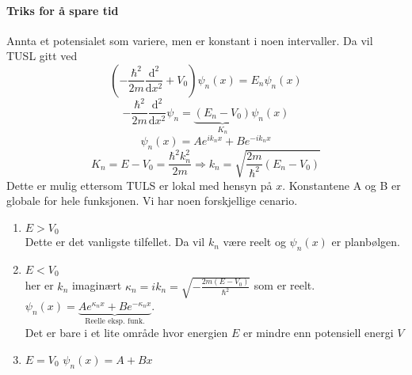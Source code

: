 \paragraph{Triks for å spare tid}
Annta et potensialet som variere, men er konstant i noen intervaller. Da vil TUSL gitt ved 
\[
\left(- \frac{ℏ^2}{2m}\frac{\mathrm{d}^2}{\mathrm{d}x^2} + V_0\right)ψ_n(x) = E_nψ_n(x)
\]
\[
- \frac{ℏ^2}{2m}\frac{\mathrm{d}^2}{\mathrm{d}x^2} ψ_n = \underbrace{\left(E_n - V_0\right)}_{K_n} ψ_n(x)
\]
\[
ψ_n(x) = A e^{i k_nx} + B e^{-i k_nx}
\]
\[
K_n = E - V_0 = \frac{ℏ^2 k_n^2}{2m} ⇒ k_n = \sqrt{\frac{2m}{ℏ^2}(E_n - V_0)}
\]
Dette er mulig ettersom TULS er lokal med hensyn på $x$. Konstantene A og B er globale for hele funksjonen. 
Vi har noen forskjellige cenario. 
\begin{enumerate}
    \item $E > V_0$\\
    Dette er det vanligste tilfellet. Da vil $k_n$ være reelt og $ψ_n(x)$ er planbølgen. 
    \item $E < V_0$\\
    her er $k_n$ imaginært $κ_n = i k_n = \displaystyle \sqrt{- \frac{2m(E- V_0)}{ℏ^2}}$ som er reelt.\\
    $ψ_n(x) = \underbrace{A e^{κ_n x} + Be^{-κ_n x}}_{\text{Reelle eksp. funk.}}$.\\ 
    Det er bare i et lite område hvor energien $E$ er mindre enn potensiell energi $V$ 
    \item $E = V_0$
    $ψ_n(x) = A + Bx$
\end{enumerate}

